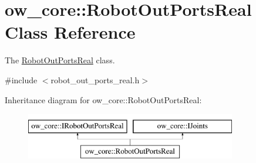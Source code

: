 \hypertarget{classow__core_1_1RobotOutPortsReal}{}\section{ow\+\_\+core\+:\+:Robot\+Out\+Ports\+Real Class Reference}
\label{classow__core_1_1RobotOutPortsReal}


The \hyperlink{classow__core_1_1RobotOutPortsReal}{Robot\+Out\+Ports\+Real} class.  




{\ttfamily \#include $<$robot\+\_\+out\+\_\+ports\+\_\+real.\+h$>$}

Inheritance diagram for ow\+\_\+core\+:\+:Robot\+Out\+Ports\+Real\+:\begin{figure}[H]
\begin{center}
\leavevmode
\includegraphics[height=2.000000cm]{df/db5/classow__core_1_1RobotOutPortsReal}
\end{center}
\end{figure}

